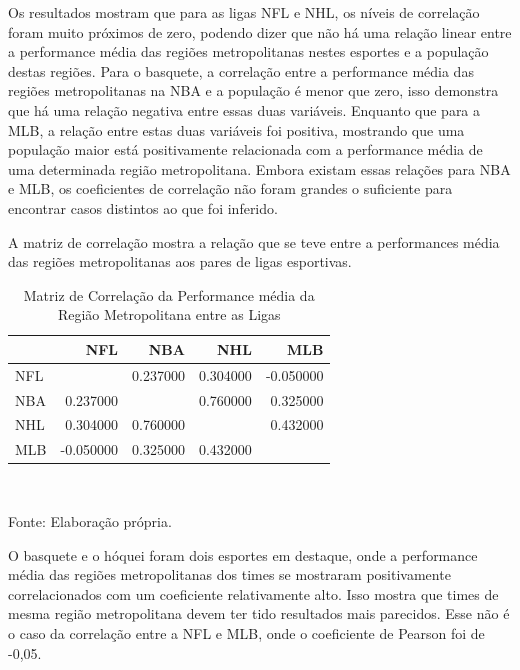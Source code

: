 \documentclass[12pt,oneside,a4paper,chapter=TITLE,english,brazil,sumario=abnt-6027-2012]{abntex2}
\begin{document}
	Os resultados mostram que para as ligas NFL e NHL, os níveis de correlação foram muito próximos de zero, podendo dizer que não há uma relação linear entre a performance média das regiões metropolitanas nestes esportes e a população destas regiões. Para o basquete, a correlação entre a performance média das regiões metropolitanas na NBA e a população é menor que zero, isso demonstra que há uma relação negativa entre essas duas variáveis. Enquanto que para a MLB, a relação entre estas duas variáveis foi positiva, mostrando que uma população maior está positivamente relacionada com a performance média de uma determinada região metropolitana. Embora existam essas relações para NBA e MLB, os coeficientes de correlação não foram grandes o suficiente para encontrar casos distintos ao que foi inferido.
	
	A matriz de correlação mostra a relação que se teve entre a performances média das regiões metropolitanas aos pares de ligas esportivas.

	\begin{table}[H]
	\centering
	\caption{Matriz de Correlação da Performance média da Região Metropolitana entre as Ligas}
	\begin{tabular}{lrrrr}
	& NFL & NBA & NHL & MLB \\\hline
	NFL &  & 0.237000 & 0.304000 & -0.050000 \\\hline
	NBA & 0.237000 &  & 0.760000 & 0.325000 \\\hline
	NHL & 0.304000 & 0.760000 &  & 0.432000 \\\hline
	MLB & -0.050000 & 0.325000 & 0.432000 &  \\\hline
	\end{tabular}
	\label{tab:corr_matrix}
	\\ \vspace{0.25cm}
	\raggedright
	\footnotesize{Fonte: Elaboração própria.}
	\end{table}	

	O basquete e o hóquei foram dois esportes em destaque, onde a performance média das regiões metropolitanas dos times se mostraram positivamente correlacionados com um coeficiente relativamente alto. Isso mostra que times de mesma região metropolitana devem ter tido resultados mais parecidos. Esse não é o caso da correlação entre a NFL e MLB, onde o coeficiente de Pearson foi de -0,05.

	
	
	
\end{document}
